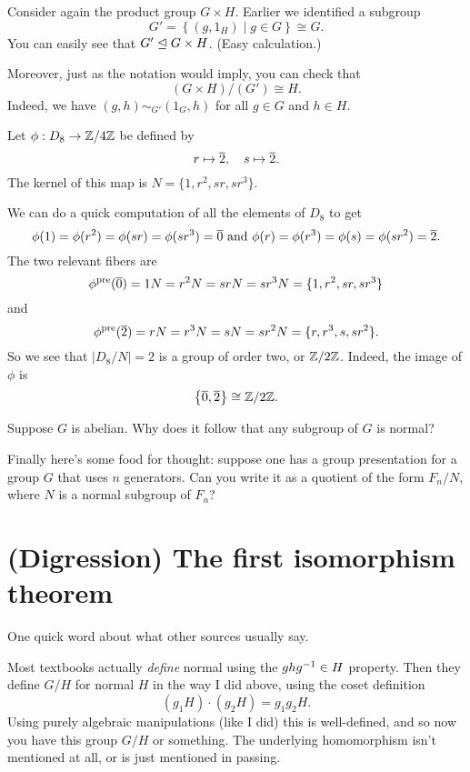 \begin{example}
	Consider again the product group $G \times H$.
	Earlier we identified a subgroup
	\[ G' =  \left\{ (g, 1_H) \mid g \in G \right\} \cong G. \]
	You can easily see that $G' \trianglelefteq G \times H$.
	(Easy calculation.)

	Moreover, just as the notation would imply, you can check that
	\[ (G \times H) / (G') \cong H. \]
	Indeed, we have $(g, h) \sim_{G'} (1_G, h)$ for all $g \in G$ and $h \in H$.
\end{example}
\begin{example}
	Let $\phi: D_8 \to \mathbb Z/4\mathbb Z$ be defined by \[ r \mapsto \overline 2, \quad s \mapsto \overline 2. \] 
	The kernel of this map is $N = \{1,r^2,sr,sr^3\}$.

	We can do a quick computation of all the elements of $D_8$ to get
	\[ \phi(1) = \phi(r^2) = \phi(sr) = \phi(sr^3) = \overline 0 
	\text{ and }
	 \phi(r) = \phi(r^3) = \phi(s) = \phi(sr^2) = \overline 2. \]
	The two relevant fibers are \[ \phi^{\text{pre}}(\overline 0) = 1N = r^2N = srN = sr^3N = \{1,r^2,sr,sr^3\} \] and 
	\[ \phi^{\text{pre}}(\overline 2) = rN = r^3N = sN = sr^2N = \{r,r^3,s,sr^2\}. \]
	So we see that $|D_8/N| = 2$ is a group of order two, or $\mathbb Z/2\mathbb Z$.
	Indeed, the image of $\phi$ is \[ \left\{ \overline 0, \overline 2 \right\} \cong \mathbb Z/2\mathbb Z. \]
\end{example}

\begin{ques}
	Suppose $G$ is abelian.
	Why does it follow that any subgroup of $G$ is normal?
\end{ques}


Finally here's some food for thought:
suppose one has a group presentation for a group $G$
that uses $n$ generators.
Can you write it as a quotient of the form $F_n / N$,
where $N$ is a normal subgroup of $F_n$?

\section{(Digression) The first isomorphism theorem}
One quick word about what other sources usually say.

Most textbooks actually \emph{define} normal using the $ghg^{-1} \in H$ property.
Then they define $G/H$ for normal $H$ in the way I did above,
using the coset definition
\[ (g_1H) \cdot (g_2H) = g_1g_2H. \]
Using purely algebraic manipulations (like I did) this is well-defined,
and so now you have this group $G/H$ or something.
The underlying homomorphism isn't mentioned at all,
or is just mentioned in passing.

